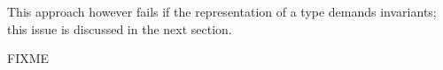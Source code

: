\begin{isabellebody}
\begin{isamarkuptext}
  This approach however fails if the representation of a type demands
  invariants; this issue is discussed in the next section.%
\end{isamarkuptext}%
\isamarkuptrue%
%
\isamarkuptrue%
%
\begin{isamarkuptext}%
FIXME%
\end{isamarkuptext}%
\isamarkuptrue%
%
\isadelimtheory
%
\endisadelimtheory
%
\isatagtheory
{}\isamarkupfalse%
%
\endisatagtheory
{\isafoldtheory}%
%
\isadelimtheory
%
\endisadelimtheory
\isanewline
\end{isabellebody}%
